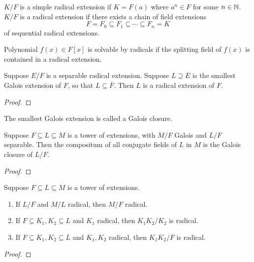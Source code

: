 \begin{definition}
    \(K/F\) is a simple radical extension if \(K = F(a)\)
    where \(a^n \in F\) for some \(n \in \mathbb{N}\).
    \(K/F\) is a radical extension if there exists a chain of field extensions
    \begin{equation*}
        F = F_0 \subseteq F_1 \subseteq \cdots \subseteq F_n = K
    \end{equation*}
    of sequential radical extensions.
\end{definition}
\begin{definition}
    Polynomial \(f(x) \in F[x]\) is solvable by radicals
    if the splitting field of \(f(x)\) is contained in a radical extension.
\end{definition}
\begin{proposition}
    Suppose \(E/F\) is a separable radical extension.
    Suppose \(L \supseteq E\) is the smallest Galois extension of \(F\),
    so that \(L \subseteq \overline{F}\).
    Then \(L\) is a radical extension of \(F\).
\end{proposition}
\begin{proof}
\end{proof}
\begin{definition}
    The smallest Galois extension is called a Galois closure.
\end{definition}

\begin{lemma}
    Suppose \(F \subseteq L \subseteq M\) is a tower of extensions,
    with \(M/F\) Galois and \(L/F\) separable.
    Then the compositum of all conjugate fields of \(L\) in \(M\)
    is the Galois closure of \(L/F\).
\end{lemma}
\begin{proof}
\end{proof}

\begin{lemma}
    Suppose \(F \subseteq L \subseteq M\) is a tower of extensions.
    \begin{enumerate}[label={(\alph*)}, itemsep=0mm]
        \item If \(L/F\) and \(M/L\) radical, then \(M/F\) radical.
        \item If \(F \subseteq K_1,K_2 \subseteq L\) and \(K_1\) radical,
            then \(K_1K_2/K_2\) is radical.
        \item If \(F \subseteq K_1,K_2 \subseteq L\) and \(K_1,K_2\) radical,
            then \(K_1K_2/F\) is radical.
    \end{enumerate}
\end{lemma}
\begin{proof}
\end{proof}

